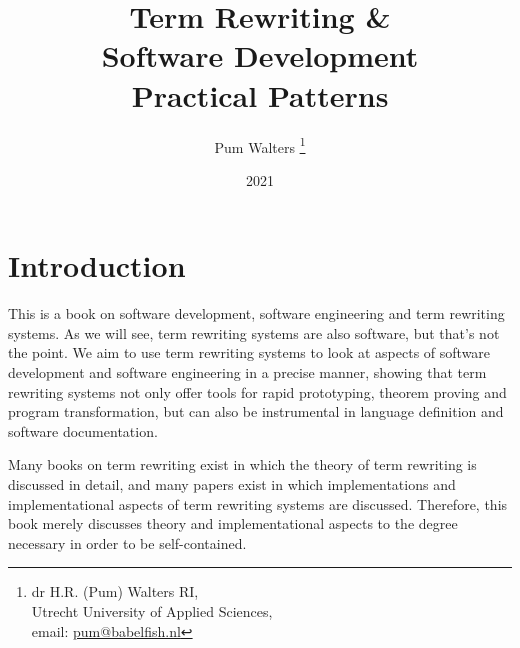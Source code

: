 \documentclass[11pt,twoside]{memoir}
\newcommand{\nopart}[1]{%
	\markright{#1}}
\begin{document}



\title{Term Rewriting \& \\ Software Development \\
\large Practical Patterns}
\date{2021}
\author{
Pum Walters
\footnote{dr H.R. (Pum) Walters RI, \\ 
Utrecht University of Applied Sciences, \\
email: \href{mailto:pum@babelfish.nl}{pum@babelfish.nl}}}
\maketitle
\thispagestyle{empty}
\clearpage






\begin{KeepFromToc}
  \tableofcontents
\end{KeepFromToc}


\clearpage
\pagestyle{plain}



\mainmatter
\setcounter{page}{1}

\nopart{Part Zero: Introduction}


\chapter*{Introduction}
This is a book on software development, software engineering  and term rewriting systems. As we will see, term rewriting systems are also software, but that's not the point. We aim to use term rewriting systems to look at aspects of software development and software engineering in a precise manner, showing that term rewriting systems not only offer tools for rapid prototyping, theorem proving and program transformation, but can also be instrumental in language definition and software documentation.

Many books on term rewriting exist in which the theory of term rewriting is discussed in detail, and many papers exist in which implementations and implementational aspects of term rewriting systems are discussed. Therefore, this book merely discusses theory and implementational aspects to the degree necessary in order to be self-contained.
\end{document}
